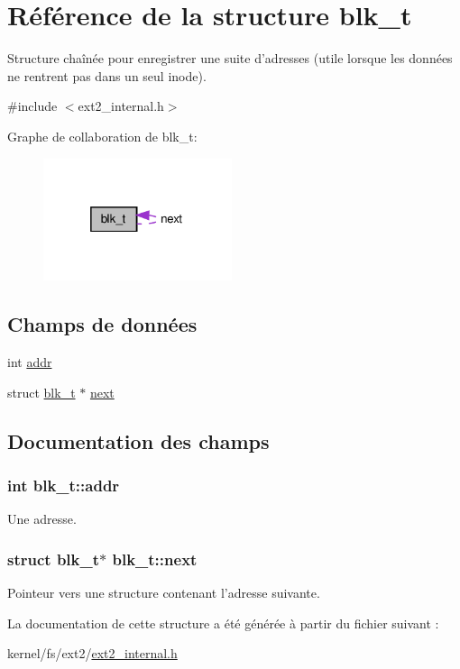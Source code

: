 \hypertarget{structblk__t}{\section{\-Référence de la structure blk\-\_\-t}
\label{structblk__t}
}


\-Structure chaînée pour enregistrer une suite d'adresses (utile lorsque les données ne rentrent pas dans un seul inode).  




{\ttfamily \#include $<$ext2\-\_\-internal.\-h$>$}



\-Graphe de collaboration de blk\-\_\-t\-:\nopagebreak
\begin{figure}[H]
\begin{center}
\leavevmode
\includegraphics[width=157pt]{structblk__t__coll__graph}
\end{center}
\end{figure}
\subsection*{\-Champs de données}
\begin{DoxyCompactItemize}
\item 
int \hyperlink{structblk__t_a7c19dc926a0c8d6bf7bb5b2fe88f8ad6}{addr}
\item 
struct \hyperlink{structblk__t}{blk\-\_\-t} $\ast$ \hyperlink{structblk__t_abd7c7af776e8fbe8b366247a859da088}{next}
\end{DoxyCompactItemize}


\subsection{\-Documentation des champs}
\hypertarget{structblk__t_a7c19dc926a0c8d6bf7bb5b2fe88f8ad6}{
\subsubsection[{addr}]{\setlength{\rightskip}{0pt plus 5cm}int {\bf blk\-\_\-t\-::addr}}}\label{structblk__t_a7c19dc926a0c8d6bf7bb5b2fe88f8ad6}
\-Une adresse. \hypertarget{structblk__t_abd7c7af776e8fbe8b366247a859da088}{
\subsubsection[{next}]{\setlength{\rightskip}{0pt plus 5cm}struct {\bf blk\-\_\-t}$\ast$ {\bf blk\-\_\-t\-::next}}}\label{structblk__t_abd7c7af776e8fbe8b366247a859da088}
\-Pointeur vers une structure contenant l'adresse suivante. 

\-La documentation de cette structure a été générée à partir du fichier suivant \-:\begin{DoxyCompactItemize}
\item 
kernel/fs/ext2/\hyperlink{ext2__internal_8h}{ext2\-\_\-internal.\-h}\end{DoxyCompactItemize}
